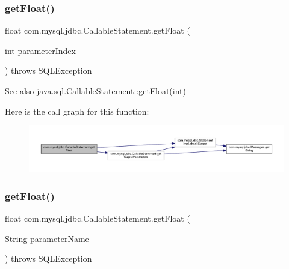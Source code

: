 \subsubsection{\texorpdfstring{get\+Float()}{getFloat()}\hspace{0.1cm}{\footnotesize\ttfamily [1/2]}}
{\footnotesize\ttfamily float com.\+mysql.\+jdbc.\+Callable\+Statement.\+get\+Float (\begin{DoxyParamCaption}\item[{int}]{parameter\+Index }\end{DoxyParamCaption}) throws S\+Q\+L\+Exception}

\begin{DoxySeeAlso}{See also}
java.\+sql.\+Callable\+Statement\+::get\+Float(int) 
\end{DoxySeeAlso}
Here is the call graph for this function\+:\nopagebreak
\begin{figure}[H]
\begin{center}
\leavevmode
\includegraphics[width=350pt]{classcom_1_1mysql_1_1jdbc_1_1_callable_statement_a8d46288adf1ec4d20ec7b7a81cd94b58_cgraph}
\end{center}
\end{figure}
\mbox{\label{classcom_1_1mysql_1_1jdbc_1_1_callable_statement_ad843b9b8fcff654bb2cfb548437624e0}} 
\subsubsection{\texorpdfstring{get\+Float()}{getFloat()}\hspace{0.1cm}{\footnotesize\ttfamily [2/2]}}
{\footnotesize\ttfamily float com.\+mysql.\+jdbc.\+Callable\+Statement.\+get\+Float (\begin{DoxyParamCaption}\item[{String}]{parameter\+Name }\end{DoxyParamCaption}) throws S\+Q\+L\+Exception}

